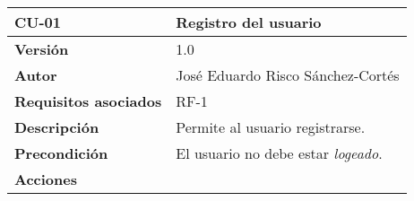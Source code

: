 \strut
\begin{longtable}[H]{@{}ll@{}}
\toprule
\begin{minipage}[b]{0.23\columnwidth}\raggedright\strut
\textbf{CU-01}\strut
\end{minipage} & \begin{minipage}[b]{0.71\columnwidth}\raggedright\strut
\textbf{Registro del usuario}\strut
\end{minipage}\tabularnewline
\midrule
\endhead
\begin{minipage}[t]{0.23\columnwidth}\raggedright\strut
\textbf{Versión}\strut
\end{minipage} & \begin{minipage}[t]{0.71\columnwidth}\raggedright\strut
1.0\strut
\end{minipage}\tabularnewline
\begin{minipage}[t]{0.23\columnwidth}\raggedright\strut
\textbf{Autor}\strut
\end{minipage} & \begin{minipage}[t]{0.71\columnwidth}\raggedright\strut
José Eduardo Risco Sánchez-Cortés\strut
\end{minipage}\tabularnewline
\begin{minipage}[t]{0.23\columnwidth}\raggedright\strut
\textbf{Requisitos asociados}\strut
\end{minipage} & \begin{minipage}[t]{0.71\columnwidth}\raggedright\strut
RF-1\strut
\end{minipage}\tabularnewline
\begin{minipage}[t]{0.23\columnwidth}\raggedright\strut
\textbf{Descripción}\strut
\end{minipage} & \begin{minipage}[t]{0.71\columnwidth}\raggedright\strut
Permite al usuario registrarse.\strut
\end{minipage}\tabularnewline
\begin{minipage}[t]{0.23\columnwidth}\raggedright\strut
\textbf{Precondición}\strut
\end{minipage} & \begin{minipage}[t]{0.71\columnwidth}\raggedright\strut
El usuario no debe estar \emph{logeado}.\strut
\end{minipage}\tabularnewline
\begin{minipage}[t]{0.23\columnwidth}%
\textbf{Acciones}\strut
\end{minipage} & \begin{minipage}[t]{0.71\columnwidth}%

\end{minipage}
\end{longtable}
